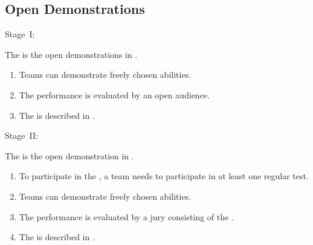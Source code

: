 \subsection{Open Demonstrations} \label{sec:open-demonstrations}
\begin{enumerate}
  {\bf\item Stage~I:} The  is the open demonstrations in .
  \begin{enumerate}
    \item Teams can demonstrate freely chosen abilities. 
    \item The performance is evaluated by an open audience.
    \item The  is described in .
  \end{enumerate}
  {\bf\item Stage~II:} The  is the open demonstration in .
  \begin{enumerate}
    \item To participate in the , a team needs to participate in at least one regular  test.
    \item Teams can demonstrate freely chosen abilities. 
    \item The performance is evaluated by a jury consisting of the .
    \item The  is described in .
  \end{enumerate}

\end{enumerate}
